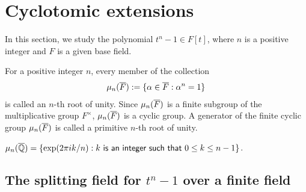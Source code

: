 \section{Cyclotomic extensions}

In this section, we study the polynomial $t^n-1\in F[t]$, where $n$ is a positive integer and $F$ is a given base field.

\begin{defi}
    For a positive integer $n$, every member of the collection
    \begin{align*}
        \mu_n(\overline{F}):=\{\alpha\in\overline{F}: \alpha^n=1\}
    \end{align*}
    is called an $n$-th root of unity.
    Since $\mu_n(\overline{F})$ is a finite subgroup of the multiplicative group $F^\times$, $\mu_n(\overline{F})$ is a cyclic group.
    A generator of the finite cyclic group $\mu_n(\overline{F})$ is called a primitive $n$-th root of unity.
\end{defi}
\begin{exmp}
    $\mu_n(\overline{{\mathbb{Q}}})=\{\exp(2\pi i k/n): \textsf{$k$ is an integer such that $0\leq k\leq n-1$}\}$.
\end{exmp}

\subsection{The splitting field for $t^n-1$ over a finite field}


